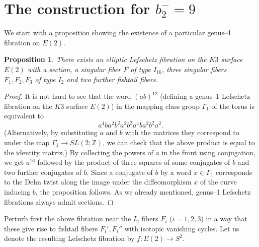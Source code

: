 \documentclass[11pt]{gtart}
\newtheorem{prop}[thm]{Proposition}
\theoremstyle{definition}
\numberwithin{equation}{section}
\newcommand{\bfz}{{\mathbb {Z}}}
\begin{document}
\section{The construction for $b_2^-=9$}

We start with a proposition showing the existence of a particular
genus--1 fibration on $E(2)$.

\begin{prop}\label{p:mcg}
There exists an elliptic Lefschetz fibration on the $K3$ surface
$E(2)$ with a section, a singular fiber $F$ of type $I_{16}$, three
singular fibers $F_1, F_2,F_3$ of type $I_2$ and two further fishtail
fibers.
\end{prop}
\begin{proof}
It is not hard to see that the word $(ab)^{12}$ (defining a genus--1
Lefschetz fibration on the $K3$ surface $E(2)$) in the mapping class
group $\Gamma _1$ of the torus is equivalent to
\[
a^4ba^2b^2a^2b^2a^4ba^2b^2a^2.
\]
(Alternatively, by substituting $a$ and $b$ with the matrices they
correspond to under the map $\Gamma _1 \to SL(2; \bfz )$, we can check
that the above product is equal to the identity matrix.)  By
collecting the powers of $a$ in the front using conjugation, we get
$a^{16}$ followed by the product of three squares of some conjugates
of $b$ and two further conjugates of $b$. Since a conjugate of $b$ by
a word $x\in \Gamma _1$ corresponds to the Dehn twist along the image
under the diffeomorphism $x$ of the curve inducing $b$, the
proposition follows.  As we already mentioned, genus--1 Lefschetz
fibrations always admit sections.
\end{proof}

Perturb first the above fibration near the $I_2$ fibers $F_i$ 
($i=1,2,3$) in a way that these give rise to fishtail fibers
$F_i', F_i ''$ with isotopic vanishing cycles. Let us denote the
resulting Lefschetz fibration by $f\colon E(2) \to S^2$.

\end{document}
